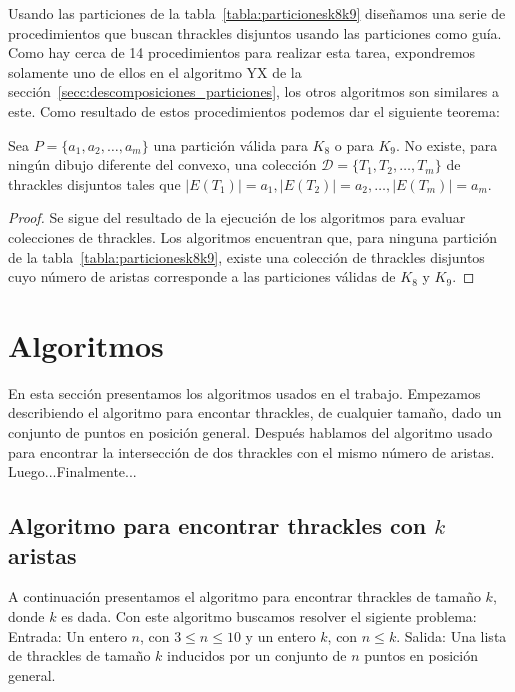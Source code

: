     Usando las particiones de la tabla~\ref{tabla:particionesk8k9} diseñamos
    una serie de procedimientos que buscan thrackles disjuntos usando las particiones como guía.
    Como hay cerca de 14 procedimientos para realizar esta tarea, expondremos solamente
    uno de ellos en el algoritmo YX de la sección~\ref{secc:descomposiciones_particiones}, los
    otros algoritmos son similares a este. Como resultado de estos procedimientos podemos dar el
    siguiente teorema:
    \begin{theorem}
      Sea $P=\{a_1,a_2,\dots,a_m\}$ una partición válida para $K_8$ o para $K_9$. No existe, para
      ningún dibujo diferente del convexo, una colección $\mathcal{D}=\{T_1,T_2,\dots,T_m\}$ de
      thrackles disjuntos tales que $|E(T_1)|=a_1,|E(T_2)|=a_2,\dots,|E(T_m)|=a_m$.
    \end{theorem}
    \begin{proof}
      Se sigue del resultado de la ejecución de los algoritmos para evaluar colecciones de
      thrackles. Los algoritmos encuentran que, para ninguna partición de la
      tabla~\ref{tabla:particionesk8k9}, existe una colección de thrackles disjuntos cuyo número de
      aristas corresponde a las particiones válidas de $K_8$ y $K_9$.
    \end{proof}

\section{Algoritmos}\label{seccion_algoritmos}
En esta sección presentamos los algoritmos usados en el trabajo. Empezamos
describiendo el algoritmo para encontar thrackles, de cualquier tamaño, dado
un conjunto de puntos en posición general. Después hablamos del algoritmo
usado para encontrar la intersección de dos thrackles con el mismo número de
aristas. Luego...Finalmente...


\subsection{Algoritmo para encontrar thrackles con $k$
  aristas}\label{seccion_algoritmo_kthrackles}
  A continuación presentamos el algoritmo para encontrar thrackles de tamaño
  $k$, donde $k$ es dada. Con este algoritmo buscamos resolver el sigiente problema:
  Entrada: Un entero $n$, con $ 3 \leq n \leq 10$ y un entero $k$, con $ n \leq k$.
  Salida: Una lista de thrackles de tamaño $k$ inducidos por un conjunto de $n$ puntos en
  posición general.

